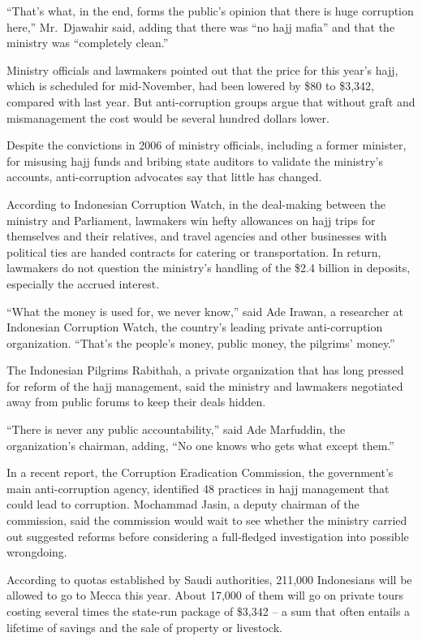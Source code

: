 ﻿\documentclass[12pt]{article}
\begin{document}
``That's what, in the end, forms the public's opinion that there is huge corruption here,''
Mr.~Djawahir said, adding that there was ``no hajj mafia'' and that the ministry was ``completely
clean.''

Ministry officials and lawmakers pointed out that the price for this year's hajj, which is scheduled
for mid-November, had been lowered by \$80 to \$3,342, compared with last year. But anti-corruption
groups argue that without graft and mismanagement the cost would be several hundred dollars lower.

Despite the convictions in 2006 of ministry officials, including a former minister, for misusing
hajj funds and bribing state auditors to validate the ministry's accounts, anti-corruption advocates
say that little has changed.

According to Indonesian Corruption Watch, in the deal-making between the ministry and Parliament,
lawmakers win hefty allowances on hajj trips for themselves and their relatives, and travel agencies
and other businesses with political ties are handed contracts for catering or transportation. In
return, lawmakers do not question the ministry's handling of the \$2.4 billion in deposits,
especially the accrued interest.

``What the money is used for, we never know,'' said Ade Irawan, a researcher at Indonesian
Corruption Watch, the country's leading private anti-corruption organization. ``That's the people's
money, public money, the pilgrims' money.''

The Indonesian Pilgrims Rabithah, a private organization that has long pressed for reform of the
hajj management, said the ministry and lawmakers negotiated away from public forums to keep their
deals hidden.

``There is never any public accountability,'' said Ade Marfuddin, the organization's chairman,
adding, ``No one knows who gets what except them.''

In a recent report, the Corruption Eradication Commission, the government's main anti-corruption
agency, identified 48 practices in hajj management that could lead to corruption. Mochammad Jasin, a
deputy chairman of the commission, said the commission would wait to see whether the ministry
carried out suggested reforms before considering a full-fledged investigation into possible
wrongdoing.

According to quotas established by Saudi authorities, 211,000 Indonesians will be allowed to go to
Mecca this year. About 17,000 of them will go on private tours costing several times the state-run
package of \$3,342 -- a sum that often entails a lifetime of savings and the sale of property or
livestock.
\end{document}
